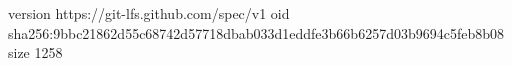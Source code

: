 version https://git-lfs.github.com/spec/v1
oid sha256:9bbc21862d55c68742d57718dbab033d1eddfe3b66b6257d03b9694c5feb8b08
size 1258

